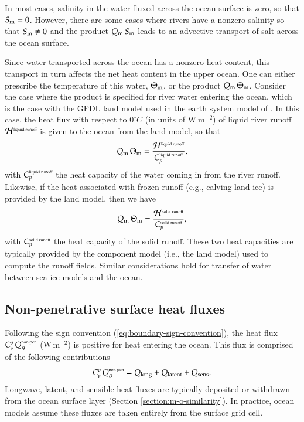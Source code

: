 In most cases, salinity in the water fluxed across the ocean surface
is zero, so that $S_{\mbox{\scriptsize m}}=0$.  However, there are some cases where rivers
have a nonzero salinity so that $S_{\mbox{\scriptsize m}} \ne 0$ and the product $Q_{\mbox{\scriptsize m}} \,
S_{\mbox{\scriptsize m}}$ leads to an advective transport of salt across the ocean surface.

Since water transported across the ocean has a nonzero heat content,
this transport in turn affects the net heat content in the upper
ocean.  One can either prescribe the temperature of this water,
$\Theta_{\mbox{\scriptsize m}}$, or the product $Q_{\mbox{\scriptsize m}} \, \Theta_{\mbox{\scriptsize m}}$.  Consider the case where
the product is specified for river water entering the ocean, which is
the case with the GFDL land model used in the earth system model of
\cite{Dunne_etal_part1_2012}.  In this case, the heat flux with
respect to $0^{\circ}C$ (in units of $\mbox{W}~\mbox{m}^{-2}$) of
liquid river runoff ${\cal H}^{\mbox{\tiny liquid runoff}}$ is given
to the ocean from the land model, so that
\begin{equation}
     Q_{\mbox{\scriptsize m}} \, \Theta_{\mbox{\scriptsize m}} = \frac{  {\cal H}^{\mbox{\tiny liquid runoff}} } {C_{p}^{\mbox{\tiny liquid runoff}}},
\label{eq:river-heating-kpp}
\end{equation}
with $C_{p}^{\mbox{\tiny liquid runoff}}$ the heat capacity of the
water coming in from the river runoff.  Likewise, if the heat
associated with frozen runoff (e.g., calving land ice) is provided by
the land model, then we have
\begin{equation}
      Q_{\mbox{\scriptsize m}} \, \Theta_{\mbox{\scriptsize m}} = \frac{{\cal H}^{\mbox{\tiny solid runoff}}}{C_{p}^{\mbox{\tiny solid runoff}}},
\end{equation}
with $C_{p}^{\mbox{\tiny solid runoff}}$ the heat capacity of the
solid runoff.  These two heat capacities are typically provided by the
component model (i.e., the land model) used to compute the runoff
fields.  Similar considerations hold for transfer of water between sea
ice models and the ocean.


\subsection{Non-penetrative surface heat fluxes} 
\label{subsection:non-pen-buoyancy-fluxes}

Following the sign convention (\ref{eq:boundary-sign-convention}), the
heat flux $C_{\mbox{\tiny p}}^{o} \, Q_{\theta}^{\mbox{\tiny
    non-pen}}$ ($\mbox{W} \, \mbox{m}^{-2}$) is positive for heat
entering the ocean. This flux is comprised of the following
contributions \citep[see page 34 of][]{Gill1982}
\begin{equation}
 C_{\mbox{\tiny p}}^{o}  \, Q_{\theta}^{\mbox{\tiny non-pen}}
 =  Q_{\mbox{\scriptsize long}} + Q_{\mbox{\scriptsize latent}} +
     Q_{\mbox{\scriptsize sens}}. 
\label{eq:non-penetrative-for-kpp}
\end{equation}
Longwave, latent, and sensible heat fluxes are typically deposited or
withdrawn from the ocean surface layer (Section
\ref{section:m-o-similarity}).  In practice, ocean models assume
these fluxes are taken entirely from the surface grid cell.  

